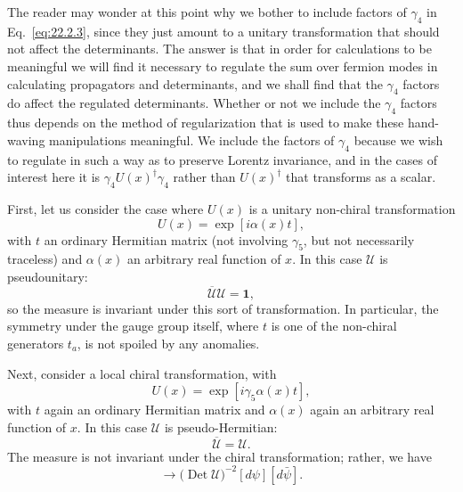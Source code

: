 The reader may wonder at this point why we bother to include factors of
$\gamma_4$ in Eq.~\eqref{eq:22.2.3}, since they just amount to a unitary
transformation that should not affect the determinants. The answer is that
in order for calculations to be meaningful we will find it necessary to
regulate the sum over fermion modes in calculating propagators and
determinants, and we shall find that the $\gamma_4$ factors do affect the
regulated determinants. Whether or not we include the $\gamma_4$ factors
thus depends on the method of regularization that is used to make these
hand-waving manipulations meaningful. We include the factors of $\gamma_4$
because we wish to regulate in such a way as to preserve Lorentz
invariance, and in the cases of interest here it is
$\gamma_4U(x)^\dagger\gamma_4$ rather than $U(x)^\dagger$ that transforms
as a scalar.

First, let us consider the case where $U(x)$ is a unitary non-chiral
transformation
\begin{equation}
 U(x)=\exp[i\alpha(x)t],
 \tag{22.2.4}\label{eq:22.2.4}
\end{equation}
with $t$ an ordinary Hermitian matrix (not involving $\gamma_5$, but not
necessarily traceless) and $\alpha(x)$ an arbitrary real function of $x$.
In this case $\mathcal U$ is pseudounitary:
\begin{equation}
 \overline{\mathcal U}\mathcal U=\mathbf{1},
 \tag{22.2.5}\label{eq:22.2.5}
\end{equation}
so the measure is invariant under this sort of transformation. In
particular, the symmetry under the gauge group itself, where $t$ is one of
the non-chiral generators $t_a$, is not spoiled by any anomalies.

Next, consider a local chiral transformation, with
\begin{equation}
 U(x)=\exp[i\gamma_5\alpha(x)t],
 \tag{22.2.6}\label{eq:22.2.6}
\end{equation}
with $t$ again an ordinary Hermitian matrix and $\alpha(x)$ again an
arbitrary real function of $x$. In this case $\mathcal U$ is
pseudo-Hermitian:
\begin{equation}
 \overline{\mathcal U}=\mathcal U.
 \tag{22.2.7}\label{eq:22.2.7}
\end{equation}
The measure is not invariant under the chiral transformation; rather, we
have
\begin{equation}
 [d\psi][d\bar\psi]\longrightarrow
 \bigl(\operatorname{Det}\mathcal U\bigr)^{-2}[d\psi][d\bar\psi].
 \tag{22.2.8}\label{eq:22.2.8}
\end{equation}

